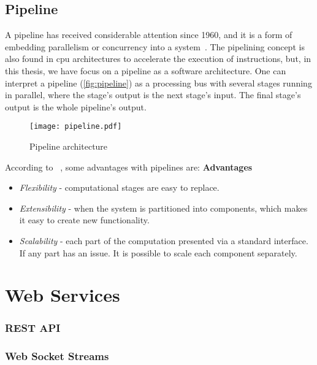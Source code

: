 \subsection{Pipeline}
A pipeline has received considerable attention since 1960, and it is a form of embedding parallelism or concurrency into a system~\cite{ramamoorthy1977pipeline}. The pipelining concept is also found in \ac{cpu} architectures to accelerate the execution of instructions, but, in this thesis, we have focus on a pipeline as a software architecture. One can interpret a pipeline (\autoref{fig:pipeline}) as a processing bus with several stages running in parallel, where the stage's output is the next stage's input. The final stage's output is the whole pipeline's output.

\begin{figure}
    \centering
    \texttt{[image: pipeline.pdf]}
    \caption{Pipeline architecture}
    \label{fig:pipeline}
\end{figure}

According to ~\cite{ml_pipeline_1}, some advantages with pipelines are:
\textbf{Advantages}
\begin{itemize}
    \item \emph{Flexibility} - computational stages are easy to replace. 
    \item \emph{Extensibility} - when the system is partitioned into components, which makes it easy to create new functionality.
    \item \emph{Scalability} - each part of the computation presented via a standard interface. If any part has an issue. It is possible to scale each component separately.
\end{itemize}

\section{Web Services}

\subsubsection{REST API}

\subsubsection{Web Socket Streams}

